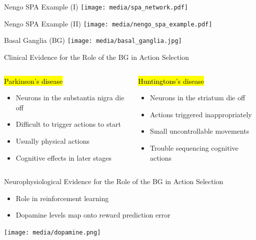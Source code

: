 \documentclass[handout,aspectratio=169]{beamer}
\begin{document}
	\begin{frame}{Nengo SPA Example (I)}
		\centering
		\texttt{[image: media/spa\_network.pdf]}
	\end{frame}

	\begin{frame}{Nengo SPA Example (II)}
		\centering
		\texttt{[image: media/nengo\_spa\_example.pdf]}
	\end{frame}

	

	\begin{frame}{Basal Ganglia (BG)}
		\centering
		\texttt{[image: media/basal\_ganglia.jpg]}
	\end{frame}

	\begin{frame}{Clinical Evidence for the Role of the BG in Action Selection}
		\begin{columns}[t]
			\begin{block}{\hl{Parkinson's disease}}
				\begin{itemize}			
					\setlength{\itemsep}{0.5cm}
					\item Neurons in the substantia nigra die off
					\item Difficult to trigger actions to start
					\item Usually physical actions
					\item Cognitive effects in later stages
				\end{itemize}
			\end{block}
			\begin{block}{\hl{Huntingtons's disease}}
				\begin{itemize}			
					\setlength{\itemsep}{0.5cm}
					\item Neurons in the striatum die off
					\item Actions triggered inappropriately
					\item Small uncontrollable movements
					\item Trouble sequencing cognitive actions					
				\end{itemize}
			\end{block}
		\end{columns}
	\end{frame}

	\begin{frame}{Neurophysiological Evidence for the Role of the BG in Action Selection}
		\begin{multicols}{2}
		\begin{itemize}
			\setlength{\itemsep}{0.25cm}
			\item Role in reinforcement learning
			\item Dopamine levels map onto reward prediction error
		\end{itemize}
		\end{multicols}
		\centering
		\texttt{[image: media/dopamine.png]}
	\end{frame}
\end{document}

